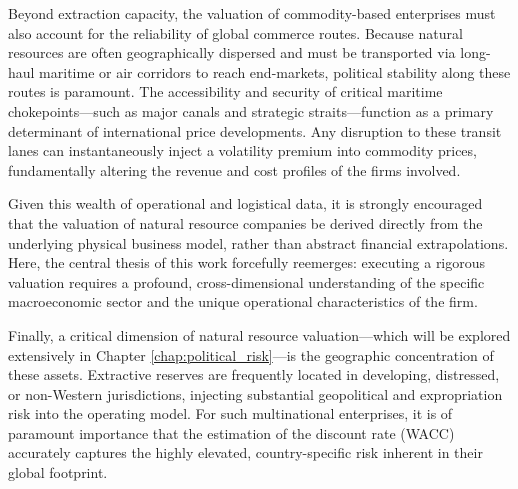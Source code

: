 Beyond extraction capacity, the valuation of commodity-based enterprises must also account for the reliability of global commerce routes. Because natural resources are often geographically dispersed and must be transported via long-haul maritime or air corridors to reach end-markets, political stability along these routes is paramount. The accessibility and security of critical maritime chokepoints—such as major canals and strategic straits—function as a primary determinant of international price developments. Any disruption to these transit lanes can instantaneously inject a volatility premium into commodity prices, fundamentally altering the revenue and cost profiles of the firms involved. 

Given this wealth of operational and logistical data, it is strongly encouraged that the valuation of natural resource companies be derived directly from the underlying physical business model, rather than abstract financial extrapolations. Here, the central thesis of this work forcefully reemerges: executing a rigorous valuation requires a profound, cross-dimensional understanding of the specific macroeconomic sector and the unique operational characteristics of the firm.

Finally, a critical dimension of natural resource valuation—which will be explored extensively in Chapter \ref{chap:political_risk}—is the geographic concentration of these assets. Extractive reserves are frequently located in developing, distressed, or non-Western jurisdictions, injecting substantial geopolitical and expropriation risk into the operating model. For such multinational enterprises, it is of paramount importance that the estimation of the discount rate (WACC) accurately captures the highly elevated, country-specific risk inherent in their global footprint.